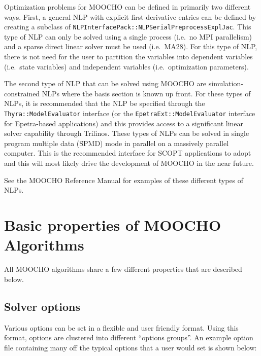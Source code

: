 \documentclass[pdf,12pt,report]{SANDreport}
\begin{document}
Optimization problems for MOOCHO can be defined in primarily two different
ways.  First, a general NLP with explicit first-derivative entries can be
defined by creating a subclass of
{}\texttt{NLPInterfacePack\-::NLP\-Serial\-Preprocess\-Expl\-Jac}.  This type
of NLP can only be solved using a single process (i.e.\ no MPI parallelism)
and a sparse direct linear solver must be used (i.e.\ MA28).  For this type of
NLP, there is not need for the user to partition the variables into dependent
variables (i.e.\ state variables) and independent variables (i.e.\
optimization parameters).

The second type of NLP that can be solved using MOOCHO are
simulation-constrained NLPs where the basis section is known up front.  For
these types of NLPs, it is recommended that the NLP be specified through the
{}\texttt{Thyra\-::Model\-Evaluator} interface (or the
{}\texttt{EpetraExt\-::Model\-Evaluator} interface for Epetra-based
applications) and this provides access to a significant linear solver
capability through Trilinos.  These types of NLPs can be solved in single
program multiple data (SPMD) mode in parallel on a massively parallel
computer.  This is the recommended interface for SCOPT applications to adopt
and this will most likely drive the development of MOOCHO in the near future.

See the MOOCHO Reference Manual {}\cite{ref:moochorefguide} for examples of
these different types of NLPs.

%
\section{Basic properties of MOOCHO Algorithms}
\label{moocho:sec:basic_algo_properties}
%

All MOOCHO algorithms share a few different properties that are described
below.

%
\subsection{Solver options}
\label{moocho:sec:solver_options}
%

Various options can be set in a flexible and user friendly format.  Using this
format, options are clustered into different ``options groups''.  An example
option file containing many off the typical options that a user would set is
shown below:
\end{document}
